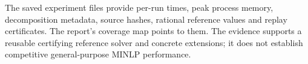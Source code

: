 The saved experiment files provide per-run times, peak process memory,
decomposition metadata, source hashes, rational reference values and
replay certificates. The report's coverage map points to them. The evidence
supports a reusable certifying reference solver and concrete extensions;
it does not establish competitive general-purpose MINLP performance.
